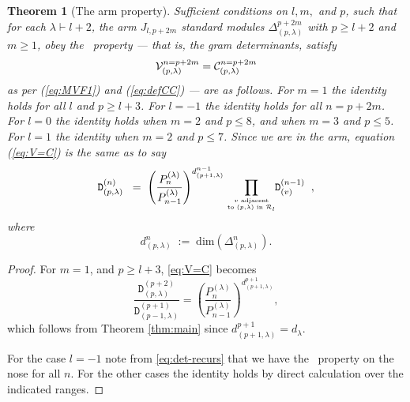 \documentclass{article}
\newcommand{\ppm}[1]{\textcolor{red}{#1}}
\newcommand{\ppmm}[1]{#1}  %
\newcommand{\bajm}[1]{\textcolor{blue}{#1}}
\newcommand{\bajmm}[1]{#1}
\newtheorem{theorem}{Theorem}[section]
\theoremstyle{definition}
\newcommand{\beq}{\begin{equation}}
\newcommand{\eq}{\end{equation}}
\newcommand{\Deltaa}{\Delta}   %
\newcommand{\Deltaaa}[2]{\Deltaa^{#1}_{#2}}
\newcommand{\Deltt}{{\mathtt D}}   %
\newcommand{\Delttt}[2]{\Deltt^{#1}_{(#2)}}  %
\def\l{\lambda}
\numberwithin{equation}{subsection}
\begin{document}
  \begin{theorem}[\bajmm{The arm property}]\label{thm:V=C}
Sufficient conditions on $l,m,$ and $p$, such that 
for each  $\l \vdash l+2$, 
%
the arm $J_{l,p+2m}$ standard modules $\Deltaaa{p+2m}{(p,\l)}{}$ with  $p\geq l+2$ and $m\geq 1$, 
\ppmm{obey the \ournotmain\ property --- that is,   
the gram determinants,} 
satisfy 
\beq   \label{eq:V=C} 
\V^{n=p+2m}_{(p,\l)} = \CC^{n=p+2m}_{(p,\l)}
\eq 
as per (\ref{eq:MVF1}) and (\ref{eq:defCC})
--- are as follows. For $m=1$ the identity holds for all $l$ and $p\geq l+3$.
For $l=-1$ the identity holds for all $n=p+2m$. 
For $l=0$ the identity holds when $m=2$ and $p\leq 8$, and when $m=3$ and $p\leq 5$. For $l=1$ the identity when $m=2$ and $p\leq 7$.
Since we are in the arm, 
equation (\ref{eq:V=C}) is the same as 
to say
\[  %
\Delttt{(n)}{p,\l}   
\;\; = \; \left(\frac{P^{(\l)}_{n}}{P^{(\l)}_{n-1}}\right)^{d^{{n-1}}_{(p+1,\l)}} %
\prod_{v \text{ adjacent}\atop \text{to } (p,\l) \text{ in } \Roll_{l}} \!\! \Delttt{(n-1)}{v}    
\;\; ,
\]
where 
$$
d^{{n}}_{(p,\l)}  \; :=  \; \text{dim}(\Deltaaa{n}{(p,\l)})    . 
$$
  \end{theorem}

\begin{proof} For $m=1$, and $p\geq l+3$, \eqref{eq:V=C} becomes
\[\frac{\Delttt{(p+2)}{p,\l}}{\Delttt{(p+1)}{p-1,\l}}=\left(\frac{P^{(\l)}_{n}}{P^{(\l)}_{n-1}}\right)^{d^{p+1}_{(p+1,\l)}}, \]
which follows from Theorem \ref{thm:main} since $d^{p+1}_{(p+1,\l)}=d_\l$.

For the case $l=-1$ note from \eqref{eq:det-recurs} that we have 
the \ournotmain\ property on the nose for all $n$. For the other cases the identity holds by direct calculation over the indicated ranges. 
\end{proof}
\end{document}
